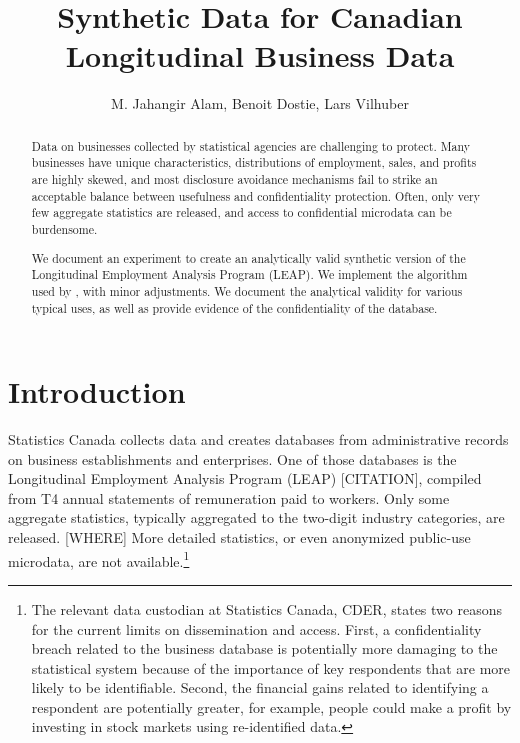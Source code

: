 \documentclass{article}
\title{Synthetic Data for Canadian Longitudinal Business Data }
\author{M. Jahangir Alam, Benoit Dostie, Lars Vilhuber}
\begin{document}
\maketitle
{}
\begin{abstract}
\noindent
Data on businesses collected by statistical agencies are challenging to protect. Many businesses have unique characteristics, distributions of employment, sales, and profits are highly skewed, and  most disclosure avoidance mechanisms  fail to strike an acceptable balance between usefulness and confidentiality protection. Often, only very few aggregate statistics are released, and access to confidential microdata can be burdensome.

We document an experiment to create an analytically valid synthetic version of the Longitudinal Employment Analysis Program (LEAP). We implement the algorithm used by \cite{RePEc:bla:istatr:v:79:y:2011:i:3:p:362-384}, with minor adjustments. We document the analytical validity for various typical uses, as well as provide evidence of the  confidentiality of the database.


\end{abstract}
\newpage
\tableofcontents
\newpage
\section{Introduction}
Statistics Canada collects data and creates databases from administrative records 
on business establishments and enterprises. One of those databases is the Longitudinal Employment Analysis Program (LEAP) [CITATION], compiled from T4 annual statements of remuneration paid to workers.
Only some aggregate statistics, typically  aggregated to the two-digit industry categories, are released. [WHERE] More detailed statistics, or even anonymized public-use microdata, are not available.\footnote{The relevant data custodian at Statistics Canada, \ac{CDER}, states two reasons for the current limits on dissemination and access.  First, a confidentiality breach related to the business database is potentially more damaging to the statistical system because of the importance of key respondents that are more likely to be identifiable. Second, the financial gains related to identifying a respondent are potentially greater, for example, people could make a profit by investing in stock markets using re-identified data.} 
\end{document}
